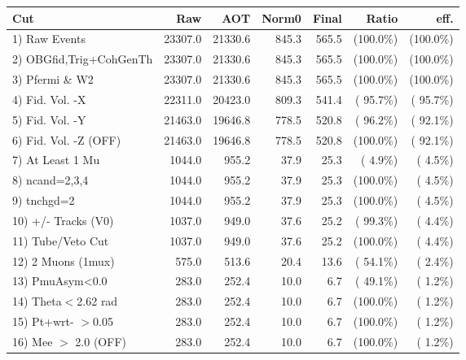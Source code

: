  \begin{table}[h!]\centering
 \begin{tabular}{||l||r|r|r|r|r|r||}
 \hline
 \hline
 Cut & Raw & AOT & Norm0 & Final & Ratio & eff.       \\
 \hline
  1) Raw Events           &      23307.0 &      21330.6 &        845.3 &        565.5 & (100.0\%) & (100.0\%) \\
  2) OBGfid,Trig+CohGenTh &      23307.0 &      21330.6 &        845.3 &        565.5 & (100.0\%) & (100.0\%) \\
  3) Pfermi \& W2         &      23307.0 &      21330.6 &        845.3 &        565.5 & (100.0\%) & (100.0\%) \\
  4) Fid. Vol. -X         &      22311.0 &      20423.0 &        809.3 &        541.4 & ( 95.7\%) & ( 95.7\%) \\
  5) Fid. Vol. -Y         &      21463.0 &      19646.8 &        778.5 &        520.8 & ( 96.2\%) & ( 92.1\%) \\
  6) Fid. Vol. -Z (OFF)   &      21463.0 &      19646.8 &        778.5 &        520.8 & (100.0\%) & ( 92.1\%) \\
  7) At Least 1 Mu        &       1044.0 &        955.2 &         37.9 &         25.3 & (  4.9\%) & (  4.5\%) \\
  8) ncand=2,3,4          &       1044.0 &        955.2 &         37.9 &         25.3 & (100.0\%) & (  4.5\%) \\
  9) tnchgd=2             &       1044.0 &        955.2 &         37.9 &         25.3 & (100.0\%) & (  4.5\%) \\
 10) +/- Tracks (V0)      &       1037.0 &        949.0 &         37.6 &         25.2 & ( 99.3\%) & (  4.4\%) \\
 11) Tube/Veto Cut        &       1037.0 &        949.0 &         37.6 &         25.2 & (100.0\%) & (  4.4\%) \\
 12) 2 Muons (1mux)       &        575.0 &        513.6 &         20.4 &         13.6 & ( 54.1\%) & (  2.4\%) \\
 13) PmuAsym<0.0          &        283.0 &        252.4 &         10.0 &          6.7 & ( 49.1\%) & (  1.2\%) \\
 14) Theta$<$2.62 rad     &        283.0 &        252.4 &         10.0 &          6.7 & (100.0\%) & (  1.2\%) \\
 15) Pt+wrt- $>$0.05      &        283.0 &        252.4 &         10.0 &          6.7 & (100.0\%) & (  1.2\%) \\
 16) Mee $>$ 2.0  (OFF)   &        283.0 &        252.4 &         10.0 &          6.7 & (100.0\%) & (  1.2\%) \\

\end{tabular}
\end{table}

